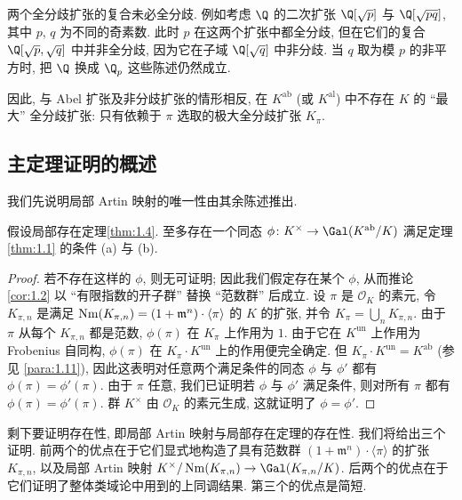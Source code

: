 \begin{npara}\label{para:1.12}
两个全分歧扩张的复合未必全分歧. 例如考虑 $\Q$ 的二次扩张 $\Q[\sqrt{p}]$ 与 $\Q[\sqrt{pq}]$, 其中 $p$, $q$ 为不同的奇素数. 此时 $p$ 在这两个扩张中都全分歧, 但在它们的复合 $\Q[\sqrt{p},\sqrt{q}]$ 中并非全分歧, 因为它在子域 $\Q[\sqrt{q}]$ 中非分歧. 当 $q$ 取为模 $p$ 的非平方时, 把 $\Q$ 换成 $\Q_p$ 这些陈述仍然成立.

因此, 与 Abel 扩张及非分歧扩张的情形相反, 在 $K^{\mathrm{ab}}$ (或 $K^{\mathrm{al}}$) 中不存在 $K$ 的 “最大” 全分歧扩张: 只有依赖于 $\pi$ 选取的极大全分歧扩张 $K_{\pi}$.
\end{npara}

\subsection*{主定理证明的概述}

我们先说明局部 Artin 映射的唯一性由其余陈述推出.

\begin{theorem}\label{thm:1.13}
假设局部存在定理\ref{thm:1.4}. 至多存在一个同态 $\phi\colon K^{\times}\to\Gal(K^{\mathrm{ab}}/K)$ 满足定理\ref{thm:1.1} 的条件 (a) 与 (b).
\end{theorem}

\begin{proof}
若不存在这样的 $\phi$, 则无可证明; 因此我们假定存在某个 $\phi$, 从而推论\ref{cor:1.2} 以 “有限指数的开子群” 替换 “范数群” 后成立. 设 $\pi$ 是 $\mathcal{O}_K$ 的素元, 令 $K_{\pi,n}$ 是满足 $\operatorname{Nm}(K_{\pi,n})=(1+\mathfrak{m}^n)\cdot\langle\pi\rangle$ 的 $K$ 的扩张, 并令 $K_{\pi}=\bigcup_n K_{\pi,n}$. 由于 $\pi$ 从每个 $K_{\pi,n}$ 都是范数, $\phi(\pi)$ 在 $K_{\pi}$ 上作用为 $1$. 由于它在 $K^{\mathrm{un}}$ 上作用为 Frobenius 自同构, $\phi(\pi)$ 在 $K_{\pi}\cdot K^{\mathrm{un}}$ 上的作用便完全确定. 但 $K_{\pi}\cdot K^{\mathrm{un}}=K^{\mathrm{ab}}$ (参见 \ref{para:1.11}), 因此这表明对任意两个满足条件的同态 $\phi$ 与 $\phi'$ 都有 $\phi(\pi)=\phi'(\pi)$. 由于 $\pi$ 任意, 我们已证明若 $\phi$ 与 $\phi'$ 满足条件, 则对所有 $\pi$ 都有 $\phi(\pi)=\phi'(\pi)$. 群 $K^{\times}$ 由 $\mathcal{O}_K$ 的素元生成, 这就证明了 $\phi=\phi'$.
\end{proof}

剩下要证明存在性, 即局部 Artin 映射与局部存在定理的存在性. 我们将给出三个证明. 前两个的优点在于它们显式地构造了具有范数群 $(1+\mathfrak{m}^n)\cdot\langle\pi\rangle$ 的扩张 $K_{\pi,n}$, 以及局部 Artin 映射 $K^{\times}/\Nm(K_{\pi,n})\to\Gal(K_{\pi,n}/K)$. 后两个的优点在于它们证明了整体类域论中用到的上同调结果. 第三个的优点是简短.

